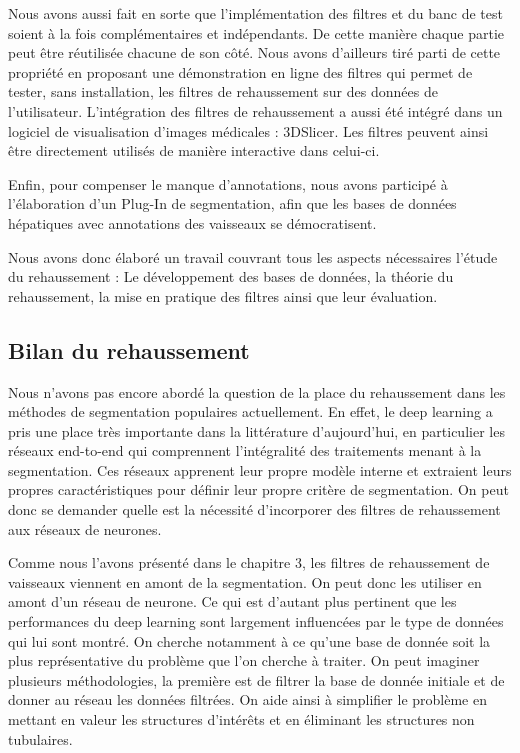Nous avons aussi fait en sorte que l'implémentation des filtres et du banc de test soient à la fois complémentaires et indépendants. De cette manière chaque partie peut être réutilisée chacune de son côté. Nous avons d'ailleurs tiré parti de cette propriété en proposant une démonstration en ligne des filtres qui permet de tester, sans installation, les filtres de rehaussement sur des données de l'utilisateur. L'intégration des filtres de rehaussement a aussi été intégré dans un logiciel de visualisation d'images médicales : 3DSlicer. Les filtres peuvent ainsi être directement utilisés de manière interactive dans celui-ci.

Enfin, pour compenser le manque d'annotations, nous avons participé à l'élaboration d'un Plug-In de segmentation, afin que les bases de données hépatiques avec annotations des vaisseaux se démocratisent. 

Nous avons donc élaboré un travail couvrant tous les aspects nécessaires l'étude du rehaussement : Le développement des bases de données, la théorie du rehaussement, la mise en pratique des filtres ainsi que leur évaluation.

\subsection{Bilan du rehaussement}

Nous n'avons pas encore abordé la question de la place du rehaussement dans les méthodes de segmentation populaires actuellement. En effet, le deep learning a pris une place très importante dans la littérature d'aujourd'hui, en particulier les réseaux end-to-end qui comprennent l'intégralité des traitements menant à la segmentation. Ces réseaux apprenent leur propre modèle interne et extraient leurs propres caractéristiques pour définir leur propre critère de segmentation. On peut donc se demander quelle est la nécessité d'incorporer des filtres de rehaussement aux réseaux de neurones.

Comme nous l'avons présenté dans le chapitre 3, les filtres de rehaussement de vaisseaux viennent en amont de la segmentation. On peut donc les utiliser en amont d'un réseau de neurone. Ce qui est d'autant plus pertinent que les performances du deep learning sont largement influencées par le type de données qui lui sont montré. On cherche notamment à ce qu'une base de donnée soit la plus représentative du problème que l'on cherche à traiter. On peut imaginer plusieurs méthodologies, la première est de filtrer la base de donnée initiale et de donner au réseau les données filtrées. On aide ainsi à simplifier le problème en mettant en valeur les structures d'intérêts et en éliminant les structures non tubulaires. 

